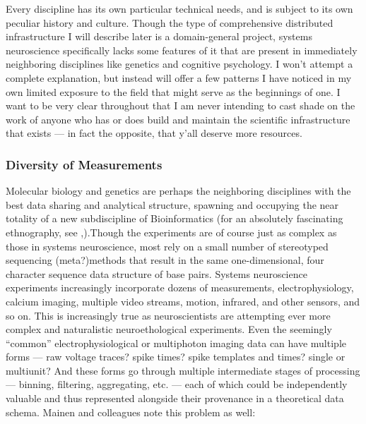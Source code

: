 \documentclass[nohyper]{tufte-book-jls}
\begin{document}
Every discipline has its own particular technical needs, and is subject
to its own peculiar history and culture. Though the type of
comprehensive distributed infrastructure I will describe later is a
domain-general project, systems neuroscience specifically lacks some
features of it that are present in immediately neighboring disciplines
like genetics and cognitive psychology. I won't attempt a complete
explanation, but instead will offer a few patterns I have noticed in my
own limited exposure to the field that might serve as the beginnings of
one. I want to be very clear throughout that I am never intending to
cast shade on the work of anyone who has or does build and maintain the
scientific infrastructure that exists --- in fact the opposite, that
y'all deserve more resources.

\hypertarget{diversity-of-measurements}{%
\subsubsection{Diversity of
Measurements}\label{diversity-of-measurements}}

Molecular biology and genetics are perhaps the neighboring disciplines
with the best data sharing and analytical structure, spawning and
occupying the near totality of a new subdiscipline of Bioinformatics
(for an absolutely fascinating ethnography, see \cite{bietzCollaborationMetagenomicsSequence2009},).Though the experiments
are of course just as complex as those in systems neuroscience, most
rely on a small number of stereotyped sequencing (meta?)methods that
result in the same one-dimensional, four character sequence data
structure of base pairs. Systems neuroscience experiments increasingly
incorporate dozens of measurements, electrophysiology, calcium imaging,
multiple video streams, motion, infrared, and other sensors, and so on.
This is increasingly true as neuroscientists are attempting ever more
complex and naturalistic neuroethological experiments. Even the
seemingly ``common'' electrophysiological or multiphoton imaging data
can have multiple forms --- raw voltage traces? spike times? spike
templates and times? single or multiunit? And these forms go through
multiple intermediate stages of processing --- binning, filtering,
aggregating, etc. --- each of which could be independently valuable and
thus represented alongside their provenance in a theoretical data
schema. Mainen and colleagues note this problem as well:
\end{document}
